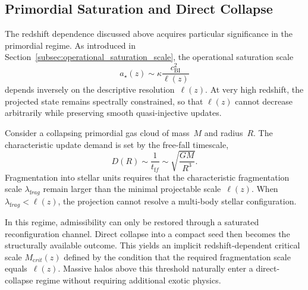 \subsection{Primordial Saturation and Direct Collapse}
  \label{subsec:primordial_saturation}

  The redshift dependence discussed above acquires particular significance
  in the primordial regime.
  As introduced in Section~\ref{subsec:operational_saturation_scale},
  the operational saturation scale
  \begin{equation}
    a_\star(z) \sim \kappa \frac{c_{\mathrm{BI}}^2}{\ell(z)}
  \end{equation}
  depends inversely on the descriptive resolution~$\ell(z)$.
  At very high redshift, the projected state remains spectrally constrained,
  so that $\ell(z)$ cannot decrease arbitrarily while preserving smooth
  quasi-injective updates.

  Consider a collapsing primordial gas cloud of mass~$M$ and radius~$R$.
  The characteristic update demand is set by the free-fall timescale,
  \begin{equation}
    D(R) \sim \frac{1}{t_{\mathrm ff}} \sim \sqrt{\frac{GM}{R^3}}.
  \end{equation}
  Fragmentation into stellar units requires that the characteristic
  fragmentation scale $\lambda_{\mathrm frag}$ remain larger than the minimal
  projectable scale~$\ell(z)$.
  When $\lambda_{\mathrm frag} < \ell(z)$, the projection cannot resolve a
  multi-body stellar configuration.

  In this regime, admissibility can only be restored through a saturated
  reconfiguration channel.
  Direct collapse into a compact seed then becomes the structurally
  available outcome.
  This yields an implicit redshift-dependent critical scale
  $M_{\mathrm crit}(z)$ defined by the condition that the required
  fragmentation scale equals~$\ell(z)$.
  Massive halos above this threshold naturally enter a direct-collapse
  regime without requiring additional exotic physics.
